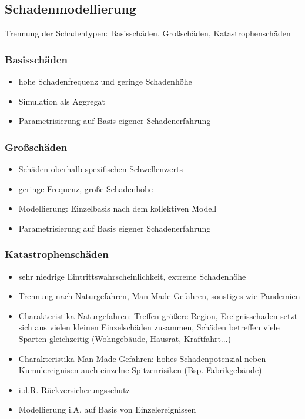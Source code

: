 \documentclass[12pt]{report}
\theoremstyle{dotless}
\theoremstyle{definition}
\begin{document}
\subsection{Schadenmodellierung}
Trennung der Schadentypen: Basisschäden, Großschäden, Katastrophenschäden

\subsubsection{Basisschäden}
\begin{itemize}
\item hohe Schadenfrequenz und geringe Schadenhöhe
\item Simulation als Aggregat
\item Parametrisierung auf Basis eigener Schadenerfahrung
\end{itemize}

\subsubsection{Großschäden}
\begin{itemize}
\item Schäden oberhalb spezifischen Schwellenwerts
\item geringe Frequenz, große Schadenhöhe
\item Modellierung: Einzelbasis nach dem kollektiven Modell
\item Parametrisierung auf Basis eigener Schadenerfahrung
\end{itemize}

\subsubsection{Katastrophenschäden}
\begin{itemize}
\item sehr niedrige Eintrittswahrscheinlichkeit, extreme Schadenhöhe
\item Trennung nach Naturgefahren, Man-Made Gefahren, sonstiges wie Pandemien
\item Charakteristika Naturgefahren: Treffen größere Region, Ereignisschaden setzt sich aus vielen kleinen Einzelschäden zusammen, Schäden betreffen viele Sparten gleichzeitig (Wohngebäude, Hausrat, Kraftfahrt...)
\item Charakteristika Man-Made Gefahren: hohes Schadenpotenzial neben Kumulereignisen auch einzelne Spitzenrisiken (Bsp. Fabrikgebäude)
\item i.d.R. Rückversicherungsschutz
\item Modellierung i.A. auf Basis von Einzelereignissen
\end{itemize}
\end{document}
